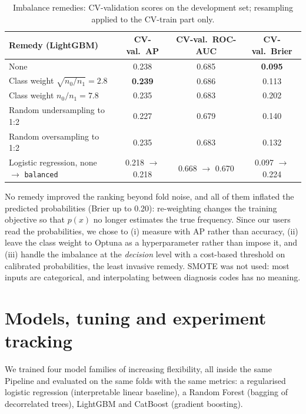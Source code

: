 \documentclass[11pt,a4paper]{article}
\newcommand{\code}[1]{\texttt{\small #1}}
\begin{document}
\begin{table}[H]
\centering\small
\begin{tabular}{lccc}
\toprule
Remedy (LightGBM) & CV-val.\ AP & CV-val.\ ROC-AUC & CV-val.\ Brier \\
\midrule
None & 0.238 & 0.685 & \textbf{0.095} \\
Class weight $\sqrt{n_0/n_1}=2.8$ & \textbf{0.239} & 0.686 & 0.113 \\
Class weight $n_0/n_1=7.8$ & 0.235 & 0.683 & 0.202 \\
Random undersampling to 1:2 & 0.227 & 0.679 & 0.140 \\
Random oversampling to 1:2 & 0.235 & 0.683 & 0.132 \\
Logistic regression, none $\rightarrow$ \code{balanced} & 0.218 $\rightarrow$ 0.218 & 0.668 $\rightarrow$ 0.670 & 0.097 $\rightarrow$ 0.224 \\
\bottomrule
\end{tabular}
\caption{Imbalance remedies: CV-validation scores on the development set; resampling applied to the CV-train part only.}
\label{tab:imbalance}
\end{table}

No remedy improved the ranking beyond fold noise, and all of them inflated the predicted probabilities (Brier up to 0.20): re-weighting changes the training objective so that $p(x)$ no longer estimates the true frequency. Since our users read the probabilities, we chose to (i) measure with AP rather than accuracy, (ii) leave the class weight to Optuna as a hyperparameter rather than impose it, and (iii) handle the imbalance at the \emph{decision} level with a cost-based threshold on calibrated probabilities, the least invasive remedy. SMOTE was not used: most inputs are categorical, and interpolating between diagnosis codes has no meaning.

\section{Models, tuning and experiment tracking}
\label{sec:models}

We trained four model families of increasing flexibility, all inside the same Pipeline and evaluated on the same folds with the same metrics: a regularised logistic regression (interpretable linear baseline), a Random Forest (bagging of decorrelated trees), LightGBM and CatBoost (gradient boosting).
\end{document}
